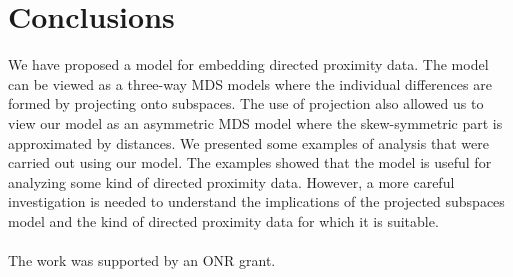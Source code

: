 \documentclass[11pt]{asaproc}
\begin{document}
\section{Conclusions}
\label{sec:conclusions}
We have proposed a model for embedding directed proximity data. The
model can be viewed as a three-way MDS models where the individual
differences are formed by projecting onto subspaces. The use of
projection also allowed us to view our model as an asymmetric MDS
model where the skew-symmetric part is approximated by distances. We
presented some examples of analysis that were carried out using our
model. The examples showed that the model is useful for analyzing some
kind of directed proximity data. However, a more careful investigation
is needed to understand the implications of the projected subspaces
model and the kind of directed proximity data for which it is
suitable. \\ \\
 The work was supported by an ONR grant.

\end{document}

